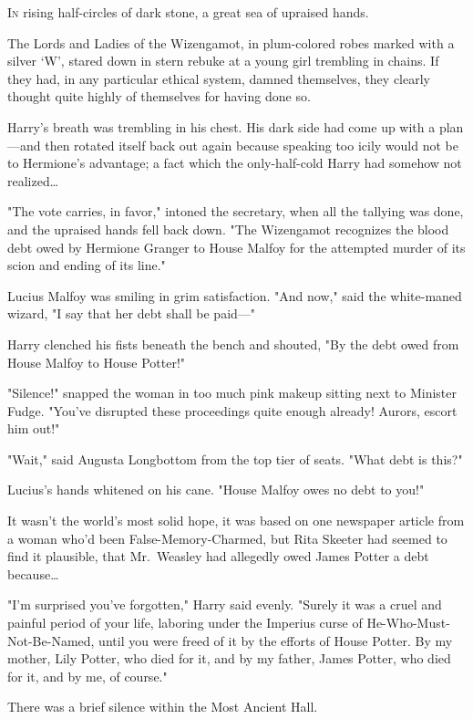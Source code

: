 
\lettrine{I}{n} rising
half-circles of dark stone, a great sea of upraised hands.

\quad\quad
The Lords and Ladies of the Wizengamot, in plum-colored robes marked with a
silver `W', stared down in stern rebuke at a young girl trembling in chains. If
they had, in any particular ethical system, damned themselves, they clearly
thought quite highly of themselves for having done so.

Harry's breath was trembling in his chest. His dark side had come up with a
plan---and then rotated itself back out again because speaking too icily would
not be to Hermione's advantage; a fact which the only-half-cold Harry had
somehow not realized{\ldots}

"The vote carries, in favor," intoned the secretary, when all the tallying was
done, and the upraised hands fell back down. "The Wizengamot recognizes the
blood debt owed by Hermione Granger to House Malfoy for the attempted murder of
its scion and ending of its line."

Lucius Malfoy was smiling in grim satisfaction. "And now," said the white-maned
wizard, "I say that her debt shall be paid---"

Harry clenched his fists beneath the bench and shouted, "By the debt owed from
House Malfoy to House Potter!"

"Silence!" snapped the woman in too much pink makeup sitting next to Minister
Fudge. "You've disrupted these proceedings quite enough already! Aurors, escort
him out!"

"Wait," said Augusta Longbottom from the top tier of seats. "What debt is this?"

Lucius's hands whitened on his cane. "House Malfoy owes no debt to you!"

It wasn't the world's most solid hope, it was based on one newspaper article
from a woman who'd been False-Memory-Charmed, but Rita Skeeter had seemed to
find it plausible, that Mr.~Weasley had allegedly owed James Potter a debt
because{\ldots}

"I'm surprised you've forgotten," Harry said evenly. "Surely it was a cruel and
painful period of your life, laboring under the Imperius curse of
He-Who-Must-Not-Be-Named, until you were freed of it by the efforts of House
Potter. By my mother, Lily Potter, who died for it, and by my father, James
Potter, who died for it, and by me, of course."

There was a brief silence within the Most Ancient Hall.

